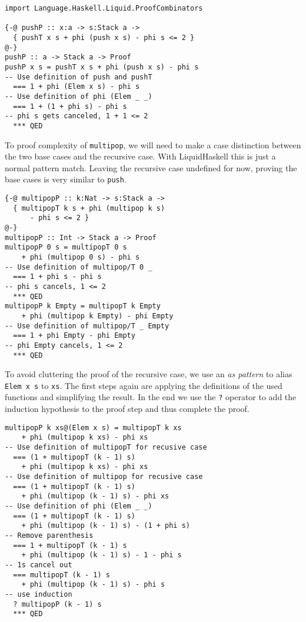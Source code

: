 \documentclass[sigplan,screen]{acmart}
\begin{document}
\begin{lstlisting}
import Language.Haskell.Liquid.ProofCombinators

{-@ pushP :: x:a -> s:Stack a ->
  { pushT x s + phi (push x s) - phi s <= 2 }
@-}
pushP :: a -> Stack a -> Proof
pushP x s = pushT x s + phi (push x s) - phi s
-- Use definition of push and pushT
  === 1 + phi (Elem x s) - phi s
-- Use definition of phi (Elem _ _)
  === 1 + (1 + phi s) - phi s
-- phi s gets canceled, 1 + 1 <= 2
  *** QED
\end{lstlisting}

To proof complexity of \texttt{multipop}, we will need to make a case distinction between the two base cases and the recursive case. With LiquidHaskell this is just a normal pattern match. Leaving the recursive case undefined for now, proving the base cases is very similar to \texttt{push}.

\begin{lstlisting}
{-@ multipopP :: k:Nat -> s:Stack a ->
  { multipopT k s + phi (multipop k s)
      - phi s <= 2 }
@-}
multipopP :: Int -> Stack a -> Proof
multipopP 0 s = multipopT 0 s
    + phi (multipop 0 s) - phi s
-- Use definition of multipop/T 0 _
  === 1 + phi s - phi s
-- phi s cancels, 1 <= 2
  *** QED
multipopP k Empty = multipopT k Empty
    + phi (multipop k Empty) - phi Empty
-- Use definition of multipop/T _ Empty
  === 1 + phi Empty - phi Empty
-- phi Empty cancels, 1 <= 2
  *** QED
\end{lstlisting}

To avoid cluttering the proof of the recursive case, we use an \textit{as pattern} to alias \texttt{Elem x s} to \texttt{xs}. The first steps again are applying the definitions of the used functions and simplifying the result. In the end we use the \texttt{?} operator to add the induction hypothesis to the proof step and thus complete the proof.

\begin{lstlisting}
multipopP k xs@(Elem x s) = multipopT k xs
    + phi (multipop k xs) - phi xs
-- Use definition of multipopT for recusive case
  === (1 + multipopT (k - 1) s)
    + phi (multipop k xs) - phi xs
-- Use definition of multipop for recusive case
  === (1 + multipopT (k - 1) s)
    + phi (multipop (k - 1) s) - phi xs
-- Use definition of phi (Elem _ _)
  === (1 + multipopT (k - 1) s)
    + phi (multipop (k - 1) s) - (1 + phi s)
-- Remove parenthesis
  === 1 + multipopT (k - 1) s
    + phi (multipop (k - 1) s) - 1 - phi s
-- 1s cancel out
  === multipopT (k - 1) s
    + phi (multipop (k - 1) s) - phi s
-- use induction
  ? multipopP (k - 1) s
  *** QED
\end{lstlisting}
\end{document}
